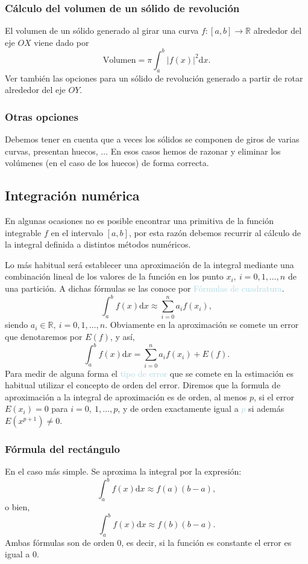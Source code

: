 \subsubsection{Cálculo del volumen de un sólido de revolución}
El volumen de un sólido generado al girar una curva $f:[a,b]\rightarrow\mathbb{R}$ alrededor del eje $OX$ viene dado por \[ \text{Volumen}=\pi\int_a^b|f(x)|^2\mathrm{d}x. \]Ver también las opciones para un sólido de revolución generado a partir de rotar alrededor del eje $OY$.
\subsubsection{Otras opciones}
Debemos tener en cuenta que a veces los sólidos se componen de giros de varias curvas, presentan huecos, $\hdots$ En esos casos hemos de razonar y eliminar los volúmenes (en el caso de los huecos) de forma correcta.
\subsection{Integración numérica}
En algunas ocasiones no es posible encontrar una primitiva de la función integrable $f$ en el intervalo $[a,b]$, por esta razón debemos recurrir al cálculo de la integral definida a distintos métodos numéricos. 

Lo más habitual será establecer una aproximación de la integral mediante una combinación lineal de los valores de la función en los punto $x_i,~i=0,1,\hdots,n$ de una partición. A dichas fórmulas se las conoce por \textcolor{lightblue}{Fórmulas de cuadratura}. \[ \int_a^bf(x)\mathrm{d}x\approx\sum_{i=0}^{n}a_if(x_i), \] siendo $a_i\in\mathbb{R},~i=0,1,\hdots, n$. Obviamente en la aproximación se comete un error que denotaremos por $E(f)$, y así, \[ \int_a^bf(x)\mathrm{d}x=\sum_{i=0}^{n}a_if(x_i)+E(f). \] Para medir de alguna forma el \textcolor{lightblue}{tipo de error} que se comete en la estimación es habitual utilizar el concepto de orden del error. Diremos que la formula de aproximación a la integral de aproximación es de orden, al menos $p$, si el error $E(x_i)=0$ para $i=0,~1,\hdots,p$, y de orden exactamente igual a \textcolor{lightblue}{$p$} si además $E(x^{p+1})\neq0$.
\subsubsection{Fórmula del rectángulo}
En el caso más simple. Se aproxima la integral por la expresión: \[ \int_a^bf(x)\mathrm{d}x\approx f(a)(b-a), \] o bien, \[ \int_a^bf(x)\mathrm{d}x\approx f(b)(b-a). \] Ambas fórmulas son de orden 0, es decir, si la función es constante el error es igual a 0.
